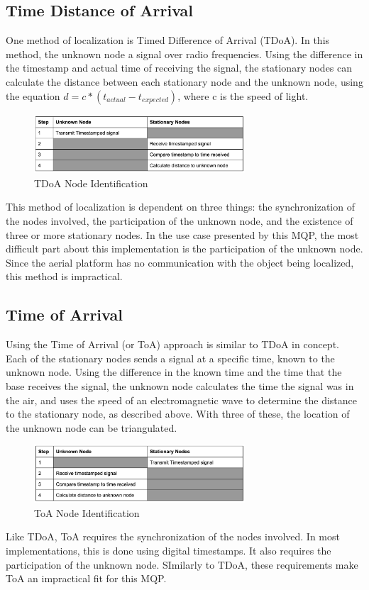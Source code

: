 \subsection{Time Distance of Arrival}
One method of localization is Timed Difference of Arrival (TDoA). In this method, the unknown node a signal over radio frequencies. Using the difference in the timestamp and actual time of receiving the signal, the stationary nodes can calculate the distance between each stationary node and the unknown node, using the equation \( d = c*(t_{actual} - t_{expected}) \), where c is the speed of light.
\begin{figure}[ht]
\centering
\includegraphics[width=0.70\textwidth]{img/tdoa_node_table.png}
\caption{TDoA Node Identification}
\label{fig:tdoa_node_identification}
\end{figure}\par
This method of localization is dependent on three things: the synchronization of the nodes involved, the participation of the unknown node, and the existence of three or more stationary nodes. In the use case presented by this MQP, the most difficult part about this implementation is the participation of the unknown node. Since the aerial platform has no communication with the object being localized, this method is impractical.

\subsection{Time of Arrival}
Using the Time of Arrival (or ToA) approach is similar to TDoA in concept\cite{local_conf}. Each of the stationary nodes sends a signal at a specific time, known to the unknown node. Using the difference in the known time and the time that the base receives the signal, the unknown node calculates the time the signal was in the air, and uses the speed of an electromagnetic wave to determine the distance to the stationary node, as described above. With three of these, the location of the unknown node can be triangulated.
\begin{figure}[ht]
\centering
\includegraphics[width=0.70\textwidth]{img/toa_node_table.png}
\caption{ToA Node Identification}
\label{fig:toa_node_identification}
\end{figure}\par
Like TDoA, ToA requires the synchronization of the nodes involved. In most implementations, this is done using digital timestamps. It also requires the participation of the unknown node. SImilarly to TDoA, these requirements make ToA an impractical fit for this MQP.

